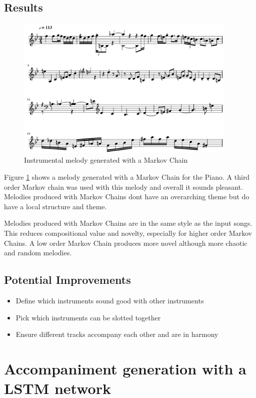 \section{Results}
\begin{figure}
\centerline{\includegraphics[width=400px]{../images/instrumental_acousticgrand.pdf}}
\caption{Instrumental melody generated with a Markov Chain}
\label{ims:instrumentalmc}
\end{figure}

Figure \ref{ims:instrumentalmc} shows a melody generated with a Markov Chain for the Piano. A third order Markov chain was used with this melody and overall it sounds pleasant. Melodies produced with Markov Chains dont have an overarching theme but do have a local structure and theme.

Melodies produced with Markov Chains are in the same style as the input songs. This reduces compositional value and novelty, especially for higher order Markov Chains. A low order Markov Chain produces more novel although more chaotic and random melodies. 

\section{Potential Improvements}
\begin{itemize}
\item Define which instruments sound good with other instruments
\item Pick which instruments can be slotted together
\item Ensure different tracks accompany each other and are in harmony
\end{itemize}

\chapter{Accompaniment generation with a LSTM network} \label{ch:accomp_lstm}

